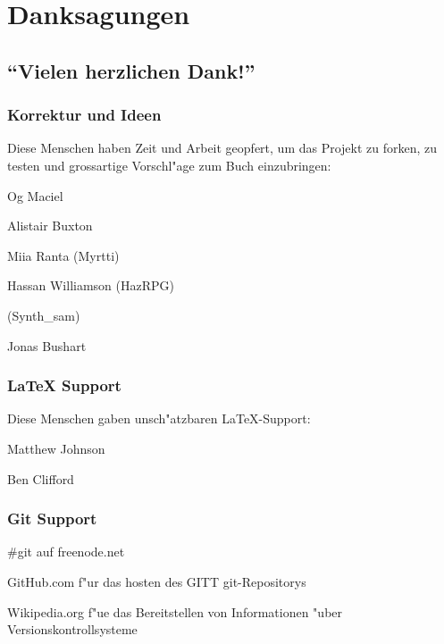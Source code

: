 \chapter{Danksagungen}
\section{``Vielen herzlichen Dank!''}

\subsection{Korrektur und Ideen}
Diese Menschen haben Zeit und Arbeit geopfert, um das Projekt zu forken, zu testen und grossartige Vorschl"age zum Buch einzubringen:

Og Maciel

Alistair Buxton

Miia Ranta (Myrtti)

Hassan Williamson (HazRPG)

(Synth\_sam)

Jonas Bushart
 
\subsection{\LaTeX{} Support}
Diese Menschen gaben unsch"atzbaren \LaTeX{}-Support:

Matthew Johnson

Ben Clifford
 
\subsection{Git Support}
\#git auf freenode.net

GitHub.com f"ur das hosten des GITT git-Repositorys
 
Wikipedia.org f"ue das Bereitstellen von Informationen "uber Versionskontrollsysteme
